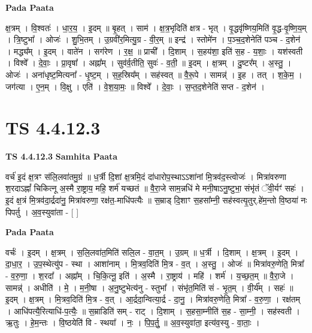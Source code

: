 \documentclass[17pt]{extarticle}
\begin{document}
\textbf{Pada Paata} \newline

क्ष॒त्रम् । वि॒श्वतः॑ । धा॒र॒य॒ । इ॒दम् ॥ बृ॒हत् । साम॑ । क्ष॒त्र॒भृदिति॑ क्षत्र - भृत् । वृ॒द्धवृ॑ष्णिय॒मिति॑ वृ॒द्ध-वृ॒ष्णि॒य॒म् । त्रि॒ष्टुभा᳚ । ओजः॑ । शु॒भि॒तम् । उ॒ग्रवी॑र॒मित्यु॒ग्र - वी॒र॒म् ॥ इन्द्र॑ । स्तोमे॑न । प॒ञ्च॒द॒शेनेति॑ पञ्च - द॒शेन॑ । मद्ध्य᳚म् । इ॒दम् । वाते॑न । सग॑रेण । र॒क्ष॒ ॥ प्राची᳚ । दि॒शाम् । स॒हय॑शा॒ इति॑ स॒ह - य॒शाः॒ । यश॑स्वती । विश्वे᳚ । दे॒वाः॒ । प्रा॒वृषा᳚ । अह्ना᳚म् । सुव॑र्व॒तीति॒ सुवः॑ - व॒ती॒ ॥ इ॒दम् । क्ष॒त्रम् । दु॒ष्टर᳚म् । अ॒स्तु॒ । ओजः॑ । अना॑धृष्ट॒मित्यना᳚ - धृ॒ष्ट॒म् । स॒ह॒स्रिय᳚म् । सह॑स्वत् ॥ वै॒रू॒पे । सामन्न्॑ । इ॒ह । तत् । श॒के॒म॒ । जग॑त्या । ए॒न॒म् । वि॒क्षु । एति॑ । वे॒श॒या॒मः॒ ॥ विश्वे᳚ । दे॒वाः॒ । स॒प्त॒द॒शेनेति॑ सप्त - द॒शेन॑ ।  \newline




\section*{ TS 4.4.12.3 }

\textbf{TS 4.4.12.3 } \newline
\textbf{Samhita Paata} \newline

वर्च॑ इ॒दं क्ष॒त्रꣳ स॑लि॒लवा॑तमु॒ग्रं ॥ ध॒र्त्री दि॒शां क्ष॒त्रमि॒दं दा॑धारोप॒स्थाऽऽशा॑नां मि॒त्रव॑द॒स्त्वोजः॑ । मित्रा॑वरुणा श॒रदाऽह्नां᳚ चिकित्नू अ॒स्मै रा॒ष्ट्राय॒ महि॒ शर्म॑ यच्छतं ॥ वै॒रा॒जे साम॒न्नधि॑ मे मनी॒षाऽनु॒ष्टुभा॒ संभृ॑तं ॅवी॒र्यꣳ॑ सहः॑ । इ॒दं क्ष॒त्रं मि॒त्रव॑दा॒र्द्रदा॑नु॒ मित्रा॑वरुणा॒ रक्ष॑त॒-माधि॑पत्यैः ॥ स॒म्राड् दि॒शाꣳ स॒हसा᳚म्नी॒ सह॑स्वत्यृ॒तुर्.हे॑म॒न्तो वि॒ष्ठया॑ नः पिपर्तु । अ॒व॒स्युवा॑ता - [  ] \newline

\textbf{Pada Paata} \newline

वर्चः॑ । इ॒दम् । क्ष॒त्रम् । स॒लि॒लवा॑त॒मिति॑ सलि॒ल - वा॒त॒म् । उ॒ग्रम् ॥ ध॒र्त्री । दि॒शाम् । क्ष॒त्रम् । इ॒दम् । दा॒धा॒र॒ । उ॒प॒स्थेत्यु॑प - स्था । आशा॑नाम् । मि॒त्रव॒दिति॑ मि॒त्र - व॒त् । अ॒स्तु॒ । ओजः॑ ॥ मित्रा॑वरु॒णेति॒ मित्रा᳚ - व॒रु॒णा॒ । श॒रदा᳚ । अह्ना᳚म् । चि॒कि॒त्नू॒ इति॑ । अ॒स्मै । रा॒ष्ट्राय॑ । महि॑ । शर्म॑ । य॒च्छ॒त॒म् ॥ वै॒रा॒जे । सामन्न्॑ । अधीति॑ । मे॒ । म॒नी॒षा । अ॒नु॒ष्टुभेत्य॑नु - स्तुभा᳚ । संभृ॑त॒मिति॑ सं - भृ॒त॒म् । वी॒र्य᳚म् । सहः॑ ॥ इ॒दम् । क्ष॒त्रम् । मि॒त्रव॒दिति॑ मि॒त्र - व॒त् । आ॒र्द्रदा॒न्वित्या॒र्द्र - दा॒नु॒ । मित्रा॑वरु॒णेति॒ मित्रा᳚ - व॒रु॒णा॒ । रक्ष॑तम् । आधि॑पत्यै॒रित्याधि॑-प॒त्यैः॒ ॥ स॒म्राडिति॑ सम् - राट् । दि॒शाम् । स॒हसा॒म्नीति॑ स॒ह - सा॒म्नी॒ । सह॑स्वती । ऋ॒तुः । हे॒म॒न्तः । वि॒ष्ठयेति॑ वि - स्थया᳚ । नः॒ । पि॒प॒र्तु॒ ॥ अ॒व॒स्युवा॑ता॒ इत्य॑व॒स्यु - वा॒ताः॒ ।  \newline
\end{document}
